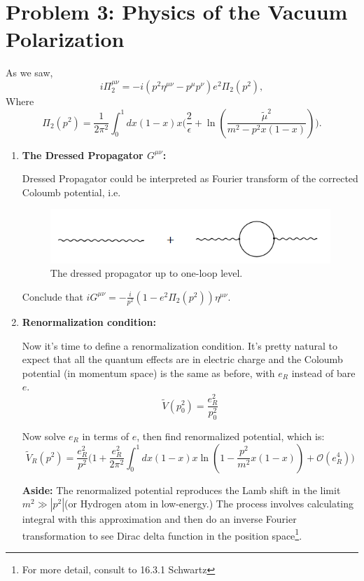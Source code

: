 \documentclass[11pt]{article}
\begin{document}
\newpage
	\section*{Problem 3: Physics of the Vacuum Polarization}
	As we saw,
	\[
	i\Pi^{\mu\nu}_2 = -i (p^2 \eta^{\mu\nu} - p^\mu p^\nu) e^2 \Pi_2(p^2),
	\]
	Where
	\[
	\Pi_2(p^2) = \frac{1}{2\pi^2} \int_0^1 dx(1-x)x \big(\frac{2}{\epsilon} + \ln(\frac{\tilde{\mu}^2}{m^2-p^2x(1-x)})\big).
 	\]
	
\begin{enumerate}
	\item
	\begin{problem}{\points{-}}
		\textbf{The Dressed Propagator $G^{\mu\nu}$:} 
		
		Dressed Propagator could be interpreted as Fourier transform of the corrected Coloumb potential, i.e.
		\begin{figure}[H]
			\centering
			\includegraphics[width=0.6\linewidth]{img/3.png}
			\caption{The dressed propagator up to one-loop level.}
			\label{dressprop}
		\end{figure}
	Conclude that $iG^{\mu\nu} = -\frac{i}{p^2} (1-e^2\Pi_2(p^2))\eta^{\mu\nu}$.
	\end{problem}

	\item
	\begin{problem}{\points{-}}
		\textbf{Renormalization condition:} 
		
		Now it's time to define a renormalization condition. It's pretty natural to expect that all the quantum effects are in electric charge and the Coloumb potential (in momentum space) is the same as before, with $e_R$ instead of bare $e$.
		\[
		\tilde{V}(p_0^2) = \frac{e^2_R}{p^2_0}
		\]
		
		Now solve $e_R$ in terms of $e$, then find renormalized potential, which is:
		\[
		\tilde{V}_R(p^2) = \frac{e^2_R}{p^2}\Big(
		1+ \frac{e^2_R}{2\pi^2} \int_0^1 dx (1-x)x\ln(1-\frac{p^2}{m^2}x(1-x))+ \mathcal{O}(e^4_R)
		\Big)
		\]
	\end{problem}
\textbf{Aside:} The renormalized potential reproduces the Lamb shift in the limit $m^2 \gg |p^2|$(or Hydrogen atom in low-energy.) The process involves calculating integral with this approximation and then do an inverse Fourier transformation to see Dirac delta function in the position space\footnote{
For more detail, consult to 16.3.1 Schwartz}.
\end{enumerate}
\end{document}
